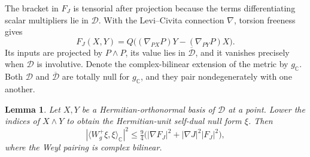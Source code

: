 \documentclass[11pt]{article}
\numberwithin{equation}{section}
\newtheorem{lemma}[theorem]{Lemma}
\theoremstyle{definition}
\theoremstyle{remark}
\begin{document}
The bracket in \(F_J\) is tensorial after projection because the
terms differentiating scalar multipliers lie in \(\mathcal D\). With
the Levi--Civita connection \(\nabla\), torsion freeness gives
\begin{equation}
 \label{secjet:bracket}
 F_J(X,Y)=Q\bigl((\nabla_{PX}P)Y-(\nabla_{PY}P)X\bigr).
\end{equation}
Its inputs are projected by \(P\wedge P\), its value lies in
\(\overline{\mathcal D}\), and it vanishes precisely when
\(\mathcal D\) is involutive. Denote the complex-bilinear extension of
the metric by \(g_{\mathbb C}\). Both \(\mathcal D\) and
\(\overline{\mathcal D}\) are totally null for \(g_{\mathbb C}\), and
they pair nondegenerately with one another.

\begin{lemma}
 \label{secjet:null}
 Let \(X,Y\) be a Hermitian-orthonormal basis of \(\mathcal D\) at a
 point. Lower the indices of \(X\wedge Y\) to obtain the Hermitian-unit
 self-dual null form \(\xi\). Then
 \begin{equation}
  \label{secjet:nullestimate}
  |\langle W_g^+\xi,\xi\rangle_{\mathbb C}|^2
       \le \tfrac94\bigl(|\nabla F_J|^2+|\nabla J|^2|F_J|^2\bigr),
 \end{equation}
 where the Weyl pairing is complex bilinear.
\end{lemma}
\end{document}
